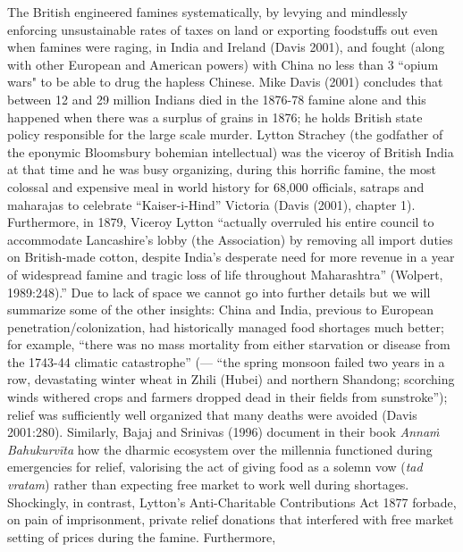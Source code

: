 The British engineered famines systematically, by levying and mindlessly enforcing unsustainable rates of taxes on land or exporting foodstuffs out even when famines were raging, in India and Ireland (Davis 2001), and fought (along with other European and American powers) with China no less than 3 ``opium wars" to be able to drug the hapless Chinese. Mike Davis (2001) concludes that between 12 and 29 million Indians died in the 1876-78 famine alone and this happened when there was a surplus of grains in 1876; he holds British state policy responsible for the large scale murder. Lytton Strachey (the godfather of the eponymic Bloomsbury bohemian intellectual) was the viceroy of British India at that time and he was busy organizing, during this horrific famine, the most colossal and expensive meal in world history for 68,000 officials, satraps and maharajas to celebrate “Kaiser-i-Hind” Victoria (Davis (2001), chapter 1). Furthermore, in 1879, Viceroy Lytton “actually overruled his entire council to accommodate Lancashire’s lobby (the Association) by removing all import duties on British-made cotton, despite India’s desperate need for more revenue in a year of widespread famine and tragic loss of life throughout Maharashtra” (Wolpert, 1989:248).” Due to lack of space we cannot go into further details but we will summarize some of the other insights: China and India, previous to European penetration/colonization, had historically managed food shortages much better; for example, “there was no mass mortality from either starvation or disease from the 1743-44 climatic catastrophe” (--- “the spring monsoon failed two years in a row, devastating winter wheat in Zhili (Hubei) and northern Shandong; scorching winds withered crops and farmers dropped dead in their fields from sunstroke”); relief was sufficiently well organized that many deaths were avoided (Davis 2001:280). Similarly, Bajaj and Srinivas (1996) document in their book {\sl Annaṁ Bahukurvīta} how the dharmic ecosystem over the millennia  functioned during emergencies for relief, valorising the act of giving food as a solemn vow ({\sl tad vratam}) rather than expecting free market to work well during shortages. Shockingly, in contrast, Lytton's Anti-Charitable Contributions Act 1877 forbade, on pain of imprisonment, private relief donations that interfered with free market setting of prices during the famine.  Furthermore, 
